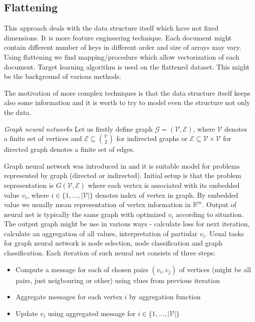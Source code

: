 \subsection{Flattening}
This approach deals with the data structure itself which have not fixed dimensions. It is more feature engineering technique. Each document might contain different number of keys in different order and size of arrays may vary. Using flattening we find mapping/procedure which allow vectorization of each document. Target learning algorithm is used on the flattened dataset. This might be the background of various methods.

The motivation of more complex techniques is that the data structure itself keeps also some information and it is worth to try to model even the structure not only the data.

\emph{Graph neural networks}
Let us firstly define graph $\mathcal{G}=(\mathcal{V},\mathcal{E})$, where $\mathcal{V}$ denotes a finite set of vertices and $\mathcal{E}\subseteq\binom{\mathcal{V}}{2}$ for indirected graphs or $\mathcal{E}\subseteq\mathcal{V}\times\mathcal{V}$ for directed graph denotes a finite set of edges. 

Graph neural network was introduced in \cite{Scarselli2009} and it is suitable model for problems represented by graph (directed or indirected). Initial setup is that the problem representation is $G(\mathcal{V},\mathcal{E})$ where each vertex is associated with its embedded value $v_i$, where $i\in\{1,\dots,|\mathcal{V}|\}$ denotes index of vertex in graph. By embedded value we usually mean representation of vertex information in $\mathbb{R}^m$. Output of neural net is typically the same graph with optimized $v_i$ according to situation. The output graph might be use in various ways - calculate loss for next iteration, calculate an aggregation of all values, interpretation of partiular $v_i$. Usual tasks for graph neural network is node selection, node classification and graph classification. Each iteration of such neural net consists of three steps:
\begin{itemize}
    \item Compute a message for each of chosen pairs $(v_i,v_j)$ of vertices (might be all pairs, just neigbouring or other) using vlues from previous iteration
    \item Aggregate messages for each vertex $i$ by aggregation function
    \item Update $v_i$ using aggregated message for $i\in\{1,\dots,|\mathcal{V}|\}$
\end{itemize}

